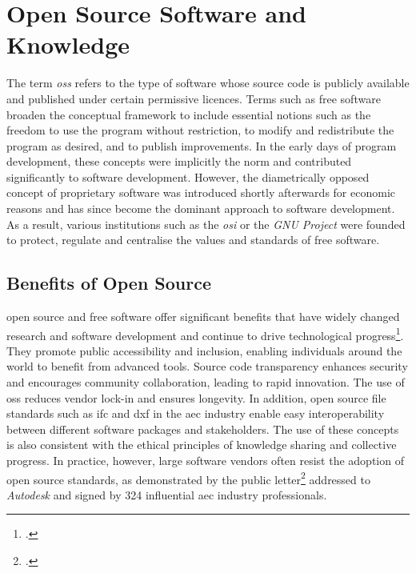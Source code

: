 \documentclass[a4paper, 12pt]{report}
\begin{document}
\section{Open Source Software and Knowledge}\label{sec:open-source-software-and-knowledge}

The term \textit{\acrfull{oss}} refers to the type of software whose source code is publicly available and published under certain permissive licences. Terms such as free software broaden the conceptual framework to include essential notions such as the freedom to use the program without restriction, to modify and redistribute the program as desired, and to publish improvements. In the early days of program development, these concepts were implicitly the norm and contributed significantly to software development. However, the diametrically opposed concept of proprietary software was introduced shortly afterwards for economic reasons and has since become the dominant approach to software development. As a result, various institutions such as the \textit{\acrfull{osi}} or the \textit{GNU Project} were founded to protect, regulate and centralise the values and standards of free software.

\subsection{Benefits of Open Source}\label{subsec:benefits-of-open-source}

\Gls{open source} and free software offer significant benefits that have widely changed research and software development and continue to drive technological progress\footcite{chaillou2022artificial}. They promote public accessibility and inclusion, enabling individuals around the world to benefit from advanced tools. Source code transparency enhances security and encourages community collaboration, leading to rapid innovation. The use of \acrlong{oss} reduces vendor lock-in and ensures longevity. In addition, \gls{open source} file standards such as \acrshort{ifc} and \acrshort{dxf} in the \acrshort{aec} industry enable easy interoperability between different software packages and stakeholders. The use of these concepts is also consistent with the ethical principles of knowledge sharing and collective progress. In practice, however, large software vendors often resist the adoption of \gls{open source} standards, as demonstrated by the public letter\footcite{ali2023architectural} addressed to \textit{Autodesk} and signed by 324 influential \acrshort{aec} industry professionals.
\end{document}
